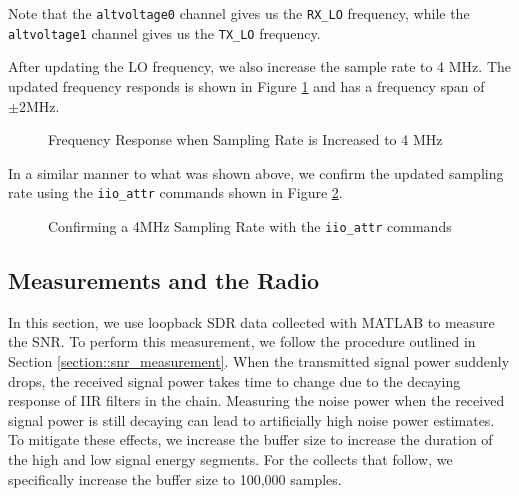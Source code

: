 \documentclass{article}
\begin{document}
Note that the \texttt{altvoltage0} channel gives us the \texttt{RX\_LO} frequency, while the \texttt{altvoltage1} channel gives us the \texttt{TX\_LO} frequency.

After updating the LO frequency, we also increase the sample rate to 4 MHz. The updated frequency responds is shown in Figure \ref{fig::gnu_radio_loopback_generic_iio_4MSPS} and has a frequency span of $\pm 2 \text{MHz}$.

\begin{figure}[H]
	\centerline{}
	\caption{Frequency Response when Sampling Rate is Increased to 4 MHz}
	\label{fig::gnu_radio_loopback_generic_iio_4MSPS}
\end{figure}

In a similar manner to what was shown above, we confirm the updated sampling rate using the \texttt{iio\_attr} commands shown in Figure \ref{fig::iio_attr_confirm_sampling_rate}.

\begin{figure}[H]
	\centerline{}
	\caption{Confirming a 4MHz Sampling Rate with the \texttt{iio\_attr} commands}
	\label{fig::iio_attr_confirm_sampling_rate}
\end{figure}

\subsection{Measurements and the Radio}

In this section, we use loopback SDR data collected with MATLAB to measure the SNR. To perform this measurement, we follow the procedure outlined in Section \ref{section::snr_measurement}. When the transmitted signal power suddenly drops, the received signal power takes time to change due to the decaying response of IIR filters in the chain. Measuring the noise power when the received signal power is still decaying can lead to artificially high noise power estimates. To mitigate these effects, we increase the buffer size to increase the duration of the high and low signal energy segments. For the collects that follow, we specifically increase the buffer size to 100,000 samples.
\end{document}
